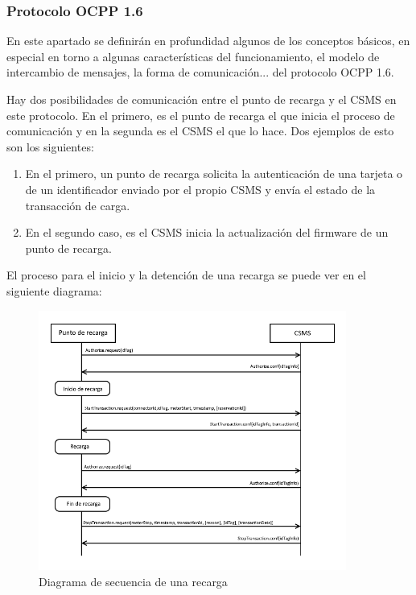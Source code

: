\documentclass[12pt,a4paper,onecolumn,oneside]{report}
\newcounter{subsubsubsection}[subsubsection]
\begin{document}
\subsubsection{Protocolo OCPP 1.6}
\label{Protocolo OCPP 1.6}

En este apartado se definirán en profundidad algunos de los conceptos básicos, en especial en torno a algunas características del funcionamiento, el modelo de intercambio de mensajes, la forma de comunicación... del protocolo OCPP 1.6.


\label{Ejemplos de funcionamiento}

Hay dos posibilidades de comunicación entre el punto de recarga y el CSMS en este protocolo. En el primero, es el punto de recarga el que inicia el proceso de comunicación y en la segunda es el CSMS el que lo hace. Dos ejemplos de esto son los siguientes:

\begin{enumerate}

\item En el primero, un punto de recarga solicita la autenticación de una tarjeta o de un identificador enviado por el propio CSMS y envía el estado de la transacción de carga.

\item En el segundo caso, es el CSMS inicia la actualización del firmware de un punto de recarga.

\end{enumerate}

El proceso para el inicio y la detención de una recarga se puede ver en el siguiente diagrama:

\begin{figure}[H] 
\centering
  \includegraphics[width=0.9\textwidth]{figuras/diagramainiciofincarga.png}
  \caption[Diagrama de secuencia de una recarga]{Diagrama de secuencia de una recarga\\
  }
  \label{fig:diagramarecarga}
\end{figure}
\end{document}
